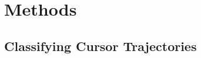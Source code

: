 \documentclass[]{../Dissertate} %
\begin{document}
\setcounter{chapter}{1}

\chapter{Methods}



\begin{appendices}
  \appendixpage
  \graphicspath{{./../Appendices/}}
  \chapter{Classifying Cursor Trajectories}\label{appendix:reversals}
  
\end{appendices}



\end{document}
